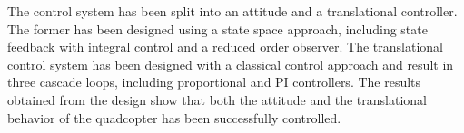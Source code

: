 The control system has been split into an attitude and a translational controller. The former has been designed using a state space approach, including state feedback with integral control and a reduced order observer. The translational control system has been designed with a classical control approach and result in three cascade loops, including proportional and PI controllers.
The results obtained from the design show that both the attitude and the translational behavior of the quadcopter has been successfully controlled.